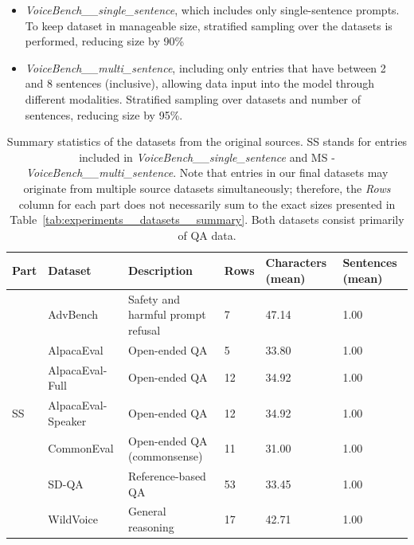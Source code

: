 \begin{appendices}
    \begin{itemize}

        \item \textit{VoiceBench\_\_single\_sentence}, which includes only single-sentence prompts. To keep dataset in manageable size, stratified sampling over the datasets is performed, reducing size by 90\%

        \item \textit{VoiceBench\_\_multi\_sentence}, including only entries that have between 2 and 8 sentences (inclusive), allowing data input into the model through different modalities. Stratified sampling over datasets and number of sentences, reducing size by 95\%.

    \end{itemize}

    \begin{table}[t!]
    \centering
    \caption{Summary statistics of the datasets from the original sources. SS stands for entries included in \textit{VoiceBench\_\_single\_sentence} and MS - \textit{VoiceBench\_\_multi\_sentence}. Note that entries in our final datasets may originate from multiple source datasets simultaneously; therefore, the \textit{Rows} column for each part does not necessarily sum to the exact sizes presented in Table~\ref{tab:experiments__datasets__summary}. Both datasets consist primarily of QA data.}

    \begin{tabular}{p{1cm} p{2.5cm} p{4.5cm} p{1cm} p{1.8cm} p{1.5cm}}

    \toprule

    \textbf{Part} & \textbf{Dataset} & \textbf{Description} & \textbf{Rows} & \textbf{Characters (mean)} & \textbf{Sentences (mean)} \\

    \midrule

    \multirow{8}{*}{SS}
     & AdvBench & Safety and harmful prompt refusal & 7 & 47.14 & 1.00 \\
     & AlpacaEval & Open-ended QA & 5 & 33.80 & 1.00 \\
     & AlpacaEval-Full & Open-ended QA & 12 & 34.92 & 1.00 \\
     & AlpacaEval-Speaker & Open-ended QA & 12 & 34.92 & 1.00 \\
     & CommonEval & Open-ended QA (commonsense) & 11 & 31.00 & 1.00 \\
     & SD-QA & Reference-based QA & 53 & 33.45 & 1.00 \\
     & WildVoice & General reasoning & 17 & 42.71 & 1.00 \\
    \hline


\end{tabular}
\end{table}
\end{appendices}
